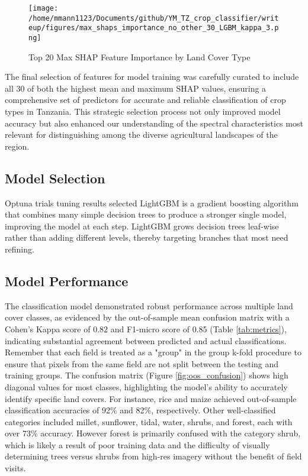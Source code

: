 \documentclass[journal]{IEEEtran}
\begin{document}
\begin{figure}[!t]
    \centering
    \texttt{[image: /home/mmann1123/Documents/github/YM\_TZ\_crop\_classifier/writeup/figures/max\_shaps\_importance\_no\_other\_30\_LGBM\_kappa\_3.png]} %
    \caption{Top 20 Max SHAP Feature Importance by Land Cover Type}
    \label{fig:max_shaps} %
\end{figure}
 
The final selection of features for model training was carefully curated to include all 30 of both the highest mean and maximum SHAP values, ensuring a comprehensive set of predictors for accurate and reliable classification of crop types in Tanzania. This strategic selection process not only improved model accuracy but also enhanced our understanding of the spectral characteristics most relevant for distinguishing among the diverse agricultural landscapes of the region.

\subsection{Model Selection}
Optuna trials tuning results selected LightGBM \cite{ke2017lightgbm} is a gradient boosting algorithm that combines many simple decision trees to produce a stronger single model, improving the model at each step. LightGBM grows decision trees leaf-wise rather than adding different levels, thereby targeting branches that most need refining.  
\subsection{Model Performance}
The classification model demonstrated robust performance across multiple land cover classes, as evidenced by the out-of-sample mean confusion matrix with a Cohen's Kappa score of 0.82 and F1-micro score of 0.85 (Table \ref{tab:metrics}), indicating substantial agreement between predicted and actual classifications. Remember that each field is treated as a "group" in the group k-fold procedure to ensure that pixels from the same field are not split between the testing and training groups.  The confusion matrix (Figure \ref{fig:oos_confusion}) shows high diagonal values for most classes, highlighting the model's ability to accurately identify specific land covers. For instance, rice and maize achieved out-of-sample classification accuracies of 92\% and 82\%, respectively. Other well-classified categories included millet, sunflower, tidal, water, shrubs, and forest, each with over 73\% accuracy. However forest is primarily confused with the category shrub, which is likely a result of poor training data and the difficulty of visually determining trees versus shrubs from high-res imagery without the benefit of field visits.
\end{document}
